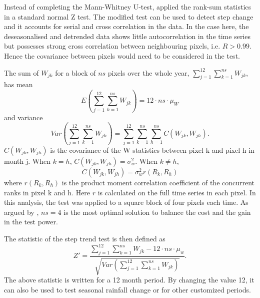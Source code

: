 \documentclass[draft,linenumbers]{agujournal}
\begin{document}
\begin{article}
Instead of completing the Mann-Whitney U-test, \citet{Hirsch1985} applied the rank-sum statistics in a standard normal Z test. The modified test can be used to detect step change and it accounts for serial and cross correlation in the data. In the case here, the deseasonalised and detrended data shows little autocorrelation in the time series but possesses strong cross correlation between neighbouring pixels, i.e. $R>0.99$. Hence the covariance between pixels would need to be considered in the test.


The sum of $W_{jk}$ for a block of $ns$ pixels over the whole year, $\sum_{j=1}^{12}\sum_{k=1}^{ns}W_{jk}$, has mean 
\begin{equation}
  E(\sum_{j=1}^{12}\sum_{k=1}^{ns}W_{jk})=12\cdot ns\cdot\mu_W
\end{equation}
and variance
\begin{equation}
  Var(\sum_{j=1}^{12}\sum_{k=1}^{ns}W_{jk})=\sum_{j=1}^{12}\sum_{k=1}^{ns}\sum_{h=1}^{ns}C(W_{jk},W_{jh}).
\end{equation}
$C(W_{jk},W_{jh})$ is the covariance of the W statistics between pixel k and pixel h in month j. When $k=h$, $C(W_{jk},W_{jh})=\sigma^2_w$. When $k\neq h$, 
\begin{equation}
  C(W_{jk},W_{jh})=\sigma^2_w r(R_k,R_h)
\end{equation}
where $r(R_k,R_h)$ is the product moment correlation coefficient of the concurrent ranks in pixel k and h. Here $r$ is calculated on the full time series in each pixel. In this analysis, the test was applied to a square block of four pixels each time. As argued by \citet{Hirsch1985}, $ns=4$ is the most optimal solution to balance the cost and the gain in the test power.

The statistic of the step trend test is then defined as 
\begin{equation}
  Z'=\frac{\sum_{j=1}^{12}\sum_{k=1}^{ns}W_{jk}-12\cdot ns\cdot\mu_w}{\sqrt{Var(\sum_{j=1}^{12}\sum_{k=1}^{ns}W_{jk})}}.
  \label{eqn:Z}
\end{equation}  
The above statistic is written for a 12 month period. By changing the value 12, it can also be used to test seasonal rainfall change or for other customized periods.


\end{article}
\end{document}
